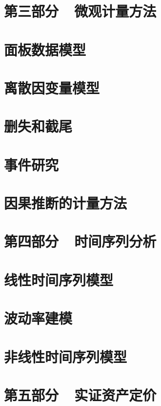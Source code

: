 \documentclass[cn,11pt,chinese]{elegantbook}
\begin{document}
\specialsectioning
\chapter{第三部分~~微观计量方法}
\setcounter{secnumdepth}{1}


\chapter{面板数据模型}

\chapter{离散因变量模型}

\chapter{删失和截尾}

\chapter{事件研究}

\chapter{因果推断的计量方法}

\specialsectioning
\chapter{第四部分~~时间序列分析}
\setcounter{secnumdepth}{1}

\chapter{线性时间序列模型}
\chapter{波动率建模}
\chapter{非线性时间序列模型}

\specialsectioning
\chapter{第五部分~~实证资产定价}
\setcounter{secnumdepth}{1}

\chapter{ }
\end{document}

